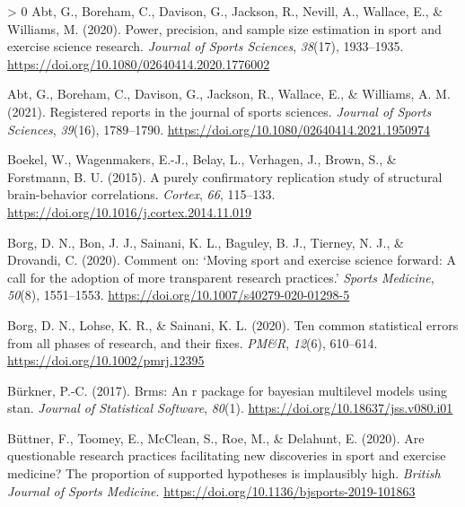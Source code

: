 \documentclass[]{cik}%
\newlength{\cslhangindent}
\newenvironment{CSLReferences}[3] %
 {%
  \setlength{\parindent}{0pt}
  \ifodd #1 \everypar{\setlength{\hangindent}{\cslhangindent}}\ignorespaces\fi
  \ifnum #2 > 0
  \setlength{\parskip}{#2\baselineskip}
  \fi
 }%
 {}
\begin{document}
\hypertarget{refs}{}
\begin{CSLReferences}{1}{0}
\leavevmode\hypertarget{ref-Abt_Boreham_Davison_Jackson_Nevill_Wallace_Williams_2020}{}%
Abt, G., Boreham, C., Davison, G., Jackson, R., Nevill, A., Wallace, E.,
\& Williams, M. (2020). Power, precision, and sample size estimation in
sport and exercise science research. \emph{Journal of Sports Sciences},
\emph{38}(17), 1933--1935.
\url{https://doi.org/10.1080/02640414.2020.1776002}

\leavevmode\hypertarget{ref-abt2021}{}%
Abt, G., Boreham, C., Davison, G., Jackson, R., Wallace, E., \&
Williams, A. M. (2021). Registered reports in the journal of sports
sciences. \emph{Journal of Sports Sciences}, \emph{39}(16), 1789--1790.
\url{https://doi.org/10.1080/02640414.2021.1950974}

\leavevmode\hypertarget{ref-Boekel_Wagenmakers_Belay_Verhagen_Brown_Forstmann_2015}{}%
Boekel, W., Wagenmakers, E.-J., Belay, L., Verhagen, J., Brown, S., \&
Forstmann, B. U. (2015). A purely confirmatory replication study of
structural brain-behavior correlations. \emph{Cortex}, \emph{66},
115--133. \url{https://doi.org/10.1016/j.cortex.2014.11.019}

\leavevmode\hypertarget{ref-Borg_Bon_Sainani_Baguley_Tierney_Drovandi_2020}{}%
Borg, D. N., Bon, J. J., Sainani, K. L., Baguley, B. J., Tierney, N. J.,
\& Drovandi, C. (2020). Comment on: {`Moving sport and exercise science
forward: A call for the adoption of more transparent research
practices.'} \emph{Sports Medicine}, \emph{50}(8), 1551--1553.
\url{https://doi.org/10.1007/s40279-020-01298-5}

\leavevmode\hypertarget{ref-Borg_Lohse_Sainani_2020}{}%
Borg, D. N., Lohse, K. R., \& Sainani, K. L. (2020). Ten common
statistical errors from all phases of research, and their fixes.
\emph{PM\&R}, \emph{12}(6), 610--614.
\url{https://doi.org/10.1002/pmrj.12395}

\leavevmode\hypertarget{ref-Burkner_2017}{}%
Bürkner, P.-C. (2017). Brms: An r package for bayesian multilevel models
using stan. \emph{Journal of Statistical Software}, \emph{80}(1).
\url{https://doi.org/10.18637/jss.v080.i01}

\leavevmode\hypertarget{ref-buttner_2020}{}%
Büttner, F., Toomey, E., McClean, S., Roe, M., \& Delahunt, E. (2020).
Are questionable research practices facilitating new discoveries in
sport and exercise medicine? {The} proportion of supported hypotheses is
implausibly high. \emph{British Journal of Sports Medicine}.
\url{https://doi.org/10.1136/bjsports-2019-101863}


\end{CSLReferences}
\end{document}
